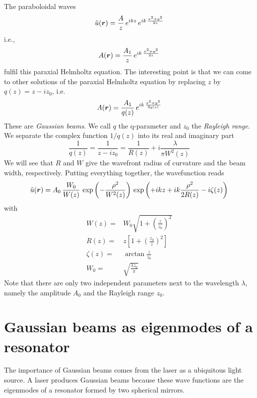 The paraboloidal waves 
\begin{equation}
    \tilde{u}(\boldsymbol{r}) = \frac{A}{z} \, e^{i k z} \, e^{i k \, \frac{x^2 + y^2}{2z}  }
\end{equation}
i.e.,
\begin{equation}
    A(\boldsymbol{r}) = \frac{A_1}{z}  \, e^{i k \, \frac{x^2 + y^2}{2z}  }
\end{equation}
fulfil this paraxial Helmholtz equation. The interesting point is that we can come to other solutions of the paraxial Helmholtz equation by replacing $z$ by $q(z) = z - i z_0$, i.e.
\begin{equation}
    A(\boldsymbol{r}) = \frac{A_1}{q(z)}  \, e^{i k \, \frac{x^2 + y^2}{2q(z)}  }
\end{equation}
These are \emph{Gaussian beams}. We call $q$ the q-parameter and $z_0$ the \emph{Rayleigh range}. We separate the complex function $1/q(z)$ into its real and imaginary part
\begin{equation}
    \frac{1}{q(z)} = \frac{1}{z -i z_0} = \frac{1}{R(z)} + i \frac{\lambda}{\pi W^2(z)}
\end{equation}
We will see that $R$ and $W$ give the wavefront radius of curvature and the beam width, respectively. Putting everything together, the wavefunction reads
\begin{equation}
    \tilde{u}(\boldsymbol{r}) = A_0 \, \frac{W_0}{W(z)} \, 
    \exp \left( - \frac{\rho^2}{W^2(z)}  \right) \, 
    \exp \left( +i kz +ik  \frac{\rho^2}{2 R(z)}  - i \zeta(z) \right) 
\end{equation}
with
\begin{align}
    W(z) = & W_0 \sqrt{1 + \left( \frac{z}{z_0} \right)^2    } \\
    R(z) = & z \left[ 1 + \left( \frac{z_0}{z} \right)^2 \right] \\
    \zeta(z) = & \arctan \frac{z}{z_0} \\
    W_0 = & \sqrt{\frac{\lambda z_0}{\pi}}
\end{align}
Note that there are only two independent parameters next to the wavelength $\lambda$, namely the amplitude $A_0$ and the Rayleigh range $z_0$.

\section{Gaussian beams as eigenmodes of a resonator}
The importance of Gaussian beams comes from the laser as a ubiquitous light source. A laser produces Gaussian beams because these wave functions are the eigenmodes of a resonator formed by two spherical mirrors.

